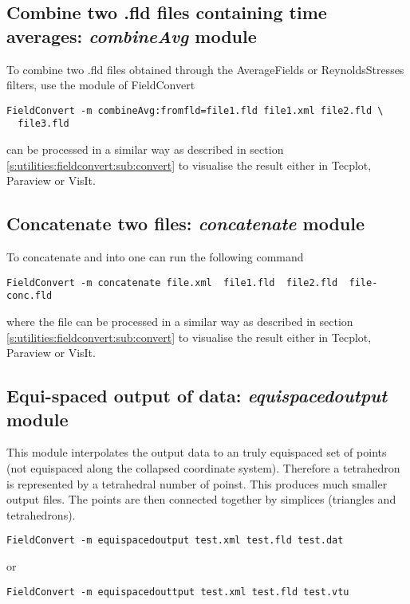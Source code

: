 \subsection{Combine two .fld files containing time averages: \textit{combineAvg} module}
To combine two .fld files obtained through the AverageFields or ReynoldsStresses filters,
use the  module of FieldConvert
%
\begin{lstlisting}[style=BashInputStyle]
  FieldConvert -m combineAvg:fromfld=file1.fld file1.xml file2.fld \
  file3.fld
\end{lstlisting}
%
 can be processed in a similar way as described 
in section \ref{s:utilities:fieldconvert:sub:convert} to visualise 
the result either in Tecplot, Paraview or VisIt.
%
%
%
\subsection{Concatenate two files: \textit{concatenate} module}
To concatenate  and  into 
one can run the following command
%
\begin{lstlisting}[style=BashInputStyle]
FieldConvert -m concatenate file.xml  file1.fld  file2.fld  file-conc.fld
\end{lstlisting}
%
where the file  can be processed in a similar
way as described in section \ref{s:utilities:fieldconvert:sub:convert}
to visualise the result either in Tecplot, Paraview or VisIt.
%
%
%
\subsection{Equi-spaced output of data: \textit{equispacedoutput} module}
This module interpolates the output data to an truly equispaced set of
points (not equispaced along the collapsed coordinate
system). Therefore a tetrahedron is represented by a tetrahedral
number of poinst. This produces much smaller output files. The points
are then connected together by simplices (triangles and tetrahedrons).

\begin{lstlisting}[style=BashInputStyle]
FieldConvert -m equispacedoutput test.xml test.fld test.dat
\end{lstlisting}

or

\begin{lstlisting}[style=BashInputStyle]
FieldConvert -m equispacedouttput test.xml test.fld test.vtu
\end{lstlisting}


